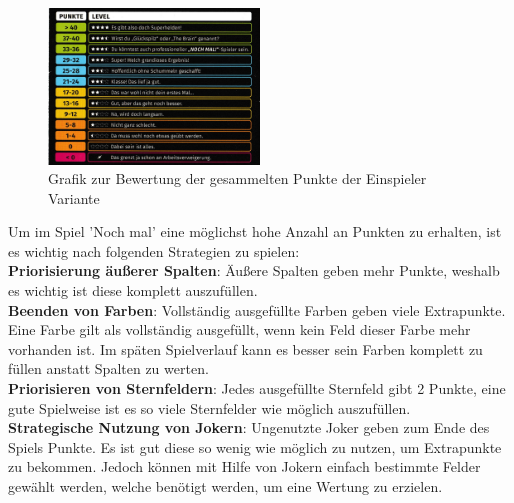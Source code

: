 \begin{figure}[!h]
	\centering
	\includegraphics[width=0.5\textwidth]{Bilder/Punkte.jpeg}
	\caption{Grafik zur Bewertung der gesammelten Punkte der Einspieler Variante 
	\cite{schmidt_spiele_gmbh_spielregeln_nodate}}
	\label{fig:Punkteübersicht}
\end{figure}


\newpage 

Um im Spiel 'Noch mal' eine möglichst hohe Anzahl an Punkten zu erhalten, ist es wichtig nach folgenden Strategien zu spielen:\\
\textbf{Priorisierung äußerer Spalten}: Äußere Spalten geben mehr Punkte, weshalb es wichtig ist diese komplett auszufüllen. \\
\textbf{Beenden von Farben}: Vollständig ausgefüllte Farben geben viele Extrapunkte. Eine Farbe gilt als vollständig ausgefüllt, wenn kein Feld dieser Farbe mehr vorhanden ist. Im späten Spielverlauf kann es besser sein Farben komplett zu füllen anstatt Spalten zu werten. \\
 \textbf{Priorisieren von Sternfeldern}: Jedes ausgefüllte Sternfeld gibt 2 Punkte, eine gute Spielweise ist es so viele Sternfelder wie möglich auszufüllen. \\
\textbf{Strategische Nutzung von Jokern}: Ungenutzte Joker geben zum Ende des Spiels Punkte. Es ist gut diese so wenig wie möglich zu nutzen, um Extrapunkte zu bekommen. Jedoch können mit Hilfe von Jokern einfach bestimmte Felder gewählt werden, welche benötigt werden, um eine Wertung zu erzielen. 
